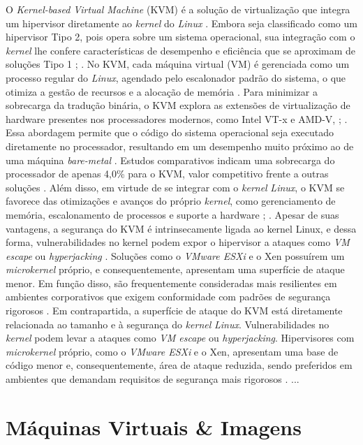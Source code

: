 \begin{itemize}
O \textit{Kernel-based Virtual Machine} (KVM) é a solução de virtualização que integra um hipervisor diretamente ao \textit{kernel} do \textit{Linux} \cite{carissimi2008}. Embora seja classificado como um hipervisor Tipo 2, pois opera sobre um sistema operacional, sua integração com o \textit{kernel} lhe confere características de desempenho e eficiência que se aproximam de soluções Tipo 1 \cite{chawla2025}; \cite{kominos2017}. No KVM, cada máquina virtual (VM) é gerenciada como um processo regular do \textit{Linux}, agendado pelo escalonador padrão do sistema, o que otimiza a gestão de recursos e a alocação de memória \cite{anand2013}.
Para minimizar a sobrecarga da tradução binária, o KVM explora as extensões de virtualização de hardware presentes nos processadores modernos, como Intel VT-x e AMD-V, \cite{chawla2025}; \cite{carissimi2008}. Essa abordagem permite que o código do sistema operacional seja executado diretamente no processador, resultando em um desempenho muito próximo ao de uma máquina \textit{bare-metal} \cite{kominos2017}. Estudos comparativos indicam uma sobrecarga do processador de apenas 4,0\% para o KVM, valor competitivo frente a outras soluções \cite{chawla2025}. Além disso, em virtude de se integrar com o \textit{kernel} \textit{Linux}, o KVM se favorece das otimizações e avanços do próprio \textit{kernel}, como gerenciamento de memória, escalonamento de processos e suporte a hardware \cite{anand2013}; \cite{arora2014}.
Apesar de suas vantagens, a segurança do KVM é intrinsecamente ligada ao kernel Linux, e dessa forma, vulnerabilidades no kernel podem expor o hipervisor a ataques como \textit{VM escape} ou \textit{hyperjacking} \cite{chawla2025}. Soluções como o \textit{VMware ESXi} e o Xen possuírem um \textit{microkernel} próprio, e consequentemente, apresentam uma superfície de ataque menor. Em função disso, são frequentemente consideradas mais resilientes em ambientes corporativos que exigem conformidade com padrões de segurança rigorosos \cite{chawla2025}.
Em contrapartida, a superfície de ataque do KVM está diretamente relacionada ao tamanho e à segurança do \textit{kernel} \textit{Linux}. Vulnerabilidades no \textit{kernel} podem levar a ataques como \textit{VM escape} ou \textit{hyperjacking}. Hipervisores com \textit{microkernel} próprio, como o \textit{VMware ESXi} e o Xen, apresentam uma base de código menor e, consequentemente, área de ataque reduzida, sendo preferidos em ambientes que demandam requisitos de segurança mais rigorosos \cite{chawla2025}.
{{ ... }}
\section{Máquinas Virtuais \& Imagens}


\end{itemize}
